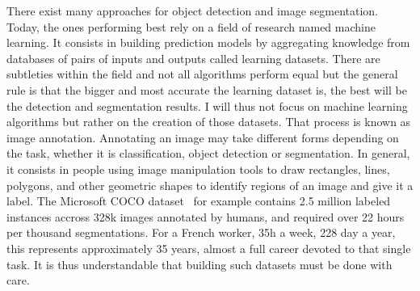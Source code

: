 There exist many approaches for object detection and image segmentation.
Today, the ones performing best rely on a field of research named machine learning.
It consists in building prediction models by aggregating knowledge
from databases of pairs of inputs and outputs called learning datasets.
There are subtleties within the field
and not all algorithms perform equal but the general rule is that
the bigger and most accurate the learning dataset is,
the best will be the detection and segmentation results.
I will thus not focus on machine learning algorithms
but rather on the creation of those datasets.
That process is known as image annotation.
Annotating an image may take different forms depending on the task,
whether it is classification, object detection or segmentation.
In general, it consists in people using image manipulation tools
to draw rectangles, lines, polygons, and other geometric shapes
to identify regions of an image and give it a label.
The Microsoft COCO dataset~\cite{lin2014microsoft} for example
contains 2.5 million labeled instances accross 328k images annotated by humans,
and required over 22 hours per thousand segmentations.
For a French worker, 35h a week, 228 day a year, this represents approximately 35 years,
almost a full career devoted to that single task.
It is thus understandable that building such datasets must be done with care.

